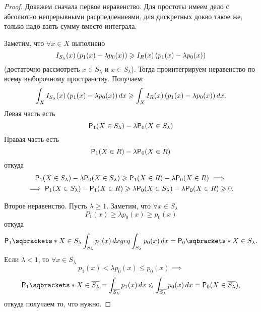 \begin{proof}
    Докажем сначала первое неравенство. Для простоты имеем дело с абсолютно непрерывными расрпедлениеями, для дискретных докво такое же, только надо взять сумму вместо интеграла.

    Заметим, что \(\forall x \in X\) выполнено
    \begin{displaymath}
        I_{S_\lambda}(x) \left(p_1(x) - \lambda p_0(x)\right) \geqslant
        I_{R}(x) \left(p_1(x) - \lambda p_0(x)\right)
    \end{displaymath}
    (достаточно рассмотреть \(x \in S_\lambda\) и \(x \in S_\lambda\)).
    Тогда проинтегрируем неравенство по всему выборочному пространству. Получаем:
    \begin{displaymath}
        \int_{X} I_{S_\lambda}(x) \left(p_1(x) - \lambda p_0(x)\right) \mathop{}\!d x \geqslant
        \int_{X} I_{R}(x) \left(p_1(x) - \lambda p_0(x)\right) \mathop{}\!d x.
    \end{displaymath}
    Левая часть есть
    \begin{displaymath}
        \PP[1](X \in S_\lambda) - \lambda \PP[0](X \in S_\lambda)
    \end{displaymath}
    Правая часть есть
    \begin{displaymath}
        \PP[1](X \in R) - \lambda \PP[0](X \in R)
    \end{displaymath}
    откуда
    \begin{multline*}
        \PP[1](X \in S_\lambda) - \lambda \PP[0](X \in S_\lambda) \geq
        \PP[1](X \in R) - \lambda \PP[0](X \in R) \implies \\ \implies
        \PP[1](X \in S_\lambda) - \PP[1](X \in R) \geq
        \lambda \PP[0](X \in S_\lambda)  - \lambda \PP[0](X \in R) \geq 0.
    \end{multline*}

    Второе неравенство. Пусть \(\lambda \geq 1\). Заметим, что \(\forall x \in S_\lambda\)
    \begin{displaymath}
        P_1(x) \geq \lambda p_0(x) \geq p_0(x)
    \end{displaymath}
    откуда
    \begin{displaymath}
        \PP[1]{X \in S_\lambda} \int_{S_\lambda} p_1(x) \diff x geq \int_{S_\lambda} p_0(x) \diff x = \PP[0]{X \in S_\lambda}.
    \end{displaymath}
    Если \(\lambda < 1\), то \(\forall x \in \overline{S_\lambda}\)
    \begin{displaymath}
        p_1(x) < \lambda p_0(x) \leq p_0(x) \implies
    \end{displaymath}
    \begin{displaymath}
        \PP[1]{X \in \overline{S_\lambda}} = \int_{\overline{S_\lambda}} p_1(x) \diff x \leq 
        \int_{\overline{S_\lambda}} p_0(x) \diff x = \PP[0](X \in \overline{S_\lambda}),
    \end{displaymath}
    откуда получаем то, что нужно.
\end{proof}

